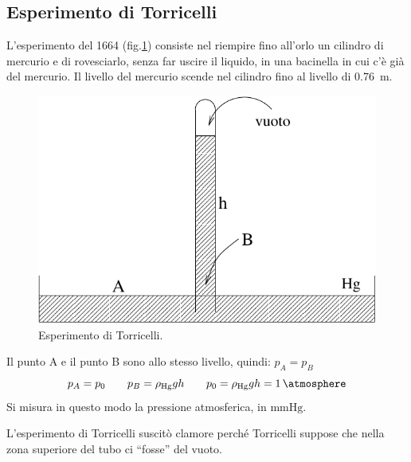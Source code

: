 \subsection{Esperimento di Torricelli}
L'esperimento del 1664 (fig.\@\ref{estor}) consiste nel riempire fino all'orlo un cilindro di mercurio e di rovesciarlo, senza far uscire il liquido, in una bacinella in cui c'è già del mercurio. Il livello del mercurio scende nel cilindro fino al livello di \SI{0.76}{\meter}.
\begin{figure}[htbp]
   \centering
   \includegraphics[scale=0.7]{immagini/fisica1/Torricelli}
   \caption{Esperimento di Torricelli.}
   \label{estor}
\end{figure}

Il punto A e il punto B sono allo stesso livello, quindi: $p_A=p_B$
\[p_A=p_0\qquad p_B=\rho_{\mathrm{Hg}}gh\qquad p_0=\rho_\mathrm{Hg}gh=\SI{1}{\atmosphere} \]
Si misura in questo modo la pressione atmosferica, in $\text{mmHg}$. %

L'esperimento di Torricelli suscitò clamore perché Torricelli suppose che nella zona superiore del tubo ci ``fosse'' del vuoto.

